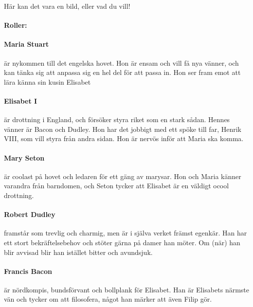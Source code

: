 \documentclass{laspex}
\begin{document}
\begin{framsida}
Här kan det vara en bild, eller vad du vill!
\end{framsida}

\begin{karaktarsida}
\paragraph{Roller:}
\paragraph{Maria Stuart} är nykommen till det engelska hovet. Hon är ensam och vill få nya vänner, och kan tänka sig att anpassa sig en hel del för att passa in. Hon ser fram emot att lära känna sin kusin Elisabet 

\paragraph{Elisabet I} är drottning i England, och försöker styra riket som en stark sådan. Hennes vänner är Bacon och Dudley. Hon har det jobbigt med ett spöke till far, Henrik VIII, som vill styra från andra sidan. Hon är nervös inför att Maria ska komma.

\paragraph{Mary Seton} är coolast på hovet och ledaren för ett gäng av marysar. Hon och Maria känner varandra från barndomen, och Seton tycker att Elisabet är en väldigt ocool drottning. 

\paragraph{Robert Dudley} framstår som trevlig och charmig, men är i själva verket främst egenkär. Han har ett stort bekräftelsebehov och stöter gärna på damer han möter. Om (när) han blir avvisad blir han istället bitter och avundsjuk.


\paragraph{Francis Bacon} är nördkompis, bundsförvant och bollplank för Elisabet. Han är Elisabets närmste vän och tycker om att filosofera, något han märker att även Filip gör.


\end{karaktarsida}
\end{document}
